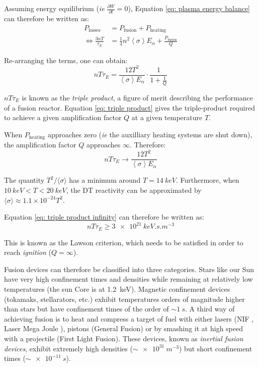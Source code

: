 Assuming energy equilibrium (\textit{ie} $\frac{\partial W}{\partial t} = 0$), Equation \ref{eq: plasma energy balance} can therefore be written as:
\begin{align}
    P_\mathrm{losses} &= P_\mathrm{fusion} + P_\mathrm{heating} \\
    \Leftrightarrow \frac{3 n T}{\tau_E} &= \frac{1}{4} n^2 \left\langle \sigma \right\rangle E_\alpha + \frac{P_\mathrm{fusion}}{Q}
\end{align}

Re-arranging the terms, one can obtain:
\begin{equation}
    n T \tau_E = \frac{12 T^2}{\left\langle \sigma \right\rangle E_\alpha} \cdot \frac{1}{1 + \frac{1}{Q}}
    \label{eq: triple product}
\end{equation}

$n T \tau_E$ is known as the \textit{triple product}, a figure of merit describing the performance of a fusion reactor.
Equation \ref{eq: triple product} gives the triple-product required to achieve a given amplification factor $Q$ at a given temperature $T$.

When $P_\mathrm{heating}$ approaches zero (\textit{ie} the auxilliary heating systems are shut down), the amplification factor $Q$ approaches $\infty$.
Therefore:
\begin{equation}
    n T \tau_E \rightarrow \frac{12 T^2}{\left\langle \sigma \right\rangle E_\alpha}
    \label{eq: triple product infinity}
\end{equation}

The quantity $T^2/\langle \sigma \rangle$ has a minimum around $T=\SI{14}{keV}$.
Furthermore, when $\SI{10}{keV} < T < \SI{20}{keV}$, the DT reactivity can be approximated by $\langle \sigma \rangle \approx 1.1 \times 10^{-24} T^2$.

Equation \ref{eq: triple product infinity} can therefore be written as:
\begin{equation}
    n T \tau_E \geq \SI{3e21}{keV.s.m^{-3}}
\end{equation}

This is known as the Lawson criterion, which needs to be satisfied in order to reach \textit{ignition} ($Q = \infty$).


Fusion devices can therefore be classified into three categories.
Stars like our Sun have very high confinement times and densities while remaining at relatively low temperatures (the sun Core is at \SI{1.2}{keV}).
Magnetic confinement devices (tokamaks, stellarators, etc.) exhibit temperatures orders of magnitude higher than stars but have confinement times of the order of $\sim \SI{1}{s}$.
A third way of achieving fusion is to heat and compress a target of fuel with either lasers (NIF , Laser Mega Joule ), pistons (General Fusion) or by smashing it at high speed with a projectile (First Light Fusion).
These devices, known as \textit{inertial fusion devices}, exhibit extremely high densities ($\sim \SI{e31}{m^{-3}}$) but short confinement times ($\sim \SI{e-11}{s}$).
 
